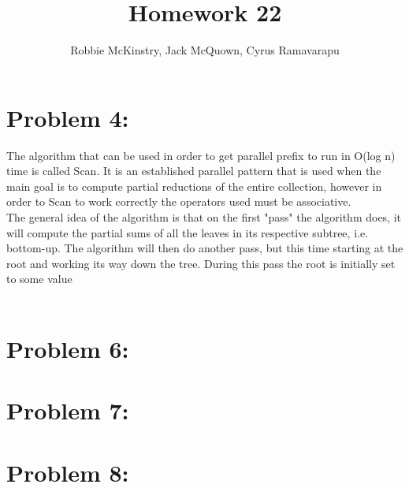 \documentclass[12pt]{article}
\begin{document}
\title{Homework 22}
\author{Robbie McKinstry, Jack McQuown, Cyrus Ramavarapu}
\renewcommand{\today}{24 October 2016}
\renewcommand{\baselinestretch}{1.5}
\maketitle

\section*{Problem 4: }
The algorithm that can be used in order to get parallel prefix to run in {O(log n)} time is called Scan. It is an established parallel pattern that is used when the main goal is to compute partial reductions of the entire collection, however in order to Scan to work correctly the operators used must be associative.\\
The general idea of the algorithm is that on the first "pass" the algorithm does, it will compute the partial sums of all the leaves in its respective subtree, i.e. bottom-up. The algorithm will then do another pass, but this time starting at the root and working its way down the tree. During this pass the root is initially set to some value \\\\
\begin{algorithm}[H]

\end{algorithm}
\section*{Problem 6: }
\section*{Problem 7: }
\section*{Problem 8: }
\end{document}
